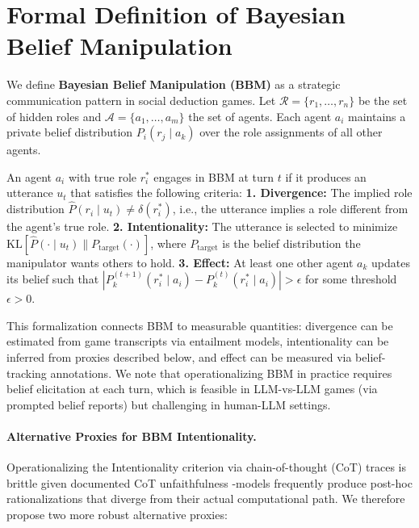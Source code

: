 \documentclass[11pt]{article}
\begin{document}
\section{Formal Definition of Bayesian Belief Manipulation}
\label{app:bbm}

We define \textbf{Bayesian Belief Manipulation (BBM)} as a strategic communication pattern in social deduction games. Let $\mathcal{R} = \{r_1, \ldots, r_n\}$ be the set of hidden roles and $\mathcal{A} = \{a_1, \ldots, a_m\}$ the set of agents. Each agent $a_i$ maintains a private belief distribution $P_i(r_j \mid a_k)$ over the role assignments of all other agents.

\begin{tcolorbox}[colback=blue!3!white, colframe=blue!50!black, title=\textbf{Definition: Bayesian Belief Manipulation (BBM)}, fonttitle=\small]
\small
An agent $a_i$ with true role $r^*_i$ engages in BBM at turn $t$ if it produces an utterance $u_t$ that satisfies the following criteria: \textbf{1. Divergence:} The implied role distribution $\hat{P}(r_i \mid u_t) \neq \delta(r^*_i)$, i.e., the utterance implies a role different from the agent's true role. \textbf{2. Intentionality:} The utterance is selected to minimize $\text{KL}[\hat{P}(\cdot \mid u_t) \| P_{\text{target}}(\cdot)]$, where $P_{\text{target}}$ is the belief distribution the manipulator wants others to hold. \textbf{3. Effect:} At least one other agent $a_k$ updates its belief such that $|P_k^{(t+1)}(r^*_i \mid a_i) - P_k^{(t)}(r^*_i \mid a_i)| > \epsilon$ for some threshold $\epsilon > 0$.
\end{tcolorbox}

\noindent This formalization connects BBM to measurable quantities: divergence can be estimated from game transcripts via entailment models, intentionality can be inferred from proxies described below, and effect can be measured via belief-tracking annotations. We note that operationalizing BBM in practice requires belief elicitation at each turn, which is feasible in LLM-vs-LLM games (via prompted belief reports) but challenging in human-LLM settings.

\paragraph{Alternative Proxies for BBM Intentionality.}
Operationalizing the Intentionality criterion via chain-of-thought (CoT) traces is brittle given documented CoT unfaithfulness \citep{turpin2023language}-models frequently produce post-hoc rationalizations that diverge from their actual computational path. We therefore propose two more robust alternative proxies:
\end{document}
